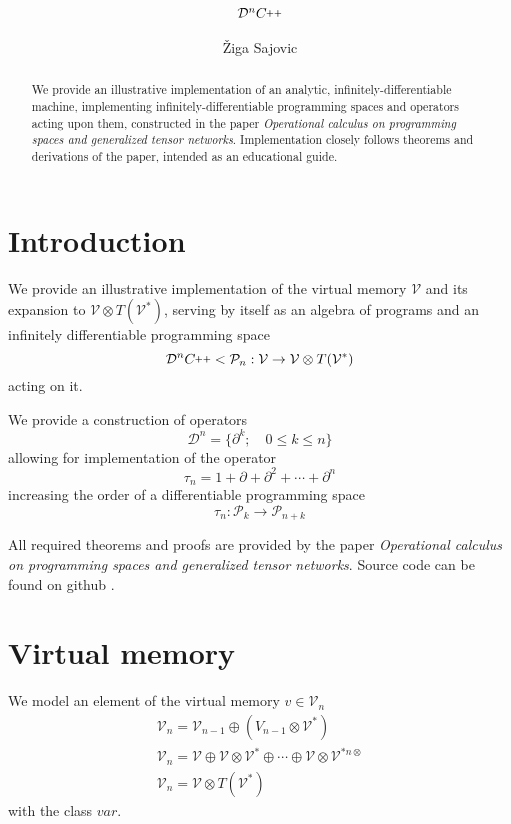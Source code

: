 \documentclass{article}
\title{$\DD^n\CC$}
\author{Žiga Sajovic}
\newcommand{\VV}{\mathcal{V}}
\newcommand{\CC}{C\nolinebreak\hspace{-.05em}\raisebox{.4ex}{\tiny\bf +}\nolinebreak\hspace{-.10em}\raisebox{.4ex}{\tiny\bf +}}
\def\CC{{C\nolinebreak[4]\hspace{-.05em}\raisebox{.4ex}{\tiny\bf ++}}}
\newcommand{\dP}{\mathcal{P}}
\newcommand{\D}{\partial}
\newcommand{\DD}{\mathcal{D}}
\newcommand{\sumd}{\tau}
\begin{document}
\maketitle

\begin{abstract}
We provide an illustrative implementation of an analytic, infinitely-differentiable machine, implementing infinitely-differentiable programming spaces and operators acting upon them, constructed in the paper \emph{Operational calculus on programming spaces and generalized tensor networks}. Implementation closely follows theorems and derivations of the paper, intended as an educational guide.
\end{abstract}

\tableofcontents

\section{Introduction}

We provide an illustrative implementation of the virtual memory $\VV$ and its expansion to $\VV\otimes T(\VV^*)$, serving by itself as an algebra of programs and an infinitely differentiable programming space
\begin{equation}
\DD^n\CC<\dP_n:\VV\to\VV\otimes T(\VV^*)
\end{equation}
acting on it.

We provide a construction of operators
\begin{equation}
\DD^n=\{\D^k;\quad 0\le k\le n\}
\end{equation}
allowing for implementation of the operator
\begin{equation}\label{eq:sumd}
\sumd_n=1+\D+\D^2+\cdots+\D^n
\end{equation}
increasing the order of a differentiable programming space
\begin{equation}
\sumd_n:\dP_k\to\dP_{n+k}
\end{equation}

All required theorems and proofs are provided by the paper \emph{Operational calculus on programming spaces and generalized tensor networks}. Source code can be found on github \cite{dCpp}.

\section{Virtual memory}

We model an element of the virtual memory $v\in\VV_n$ 
\begin{eqnarray}
\VV_{n}=\VV_{n-1}\oplus(V_{n-1}\otimes\VV^*) \\
\VV_{n}=\VV\oplus\VV\otimes\VV^*\oplus\cdots\oplus\VV\otimes\VV^{*n\otimes}\\ \label{eq:V_n}
\VV_n=\VV\otimes T(\VV^*)
\end{eqnarray}
with the class $var$.
\end{document}
